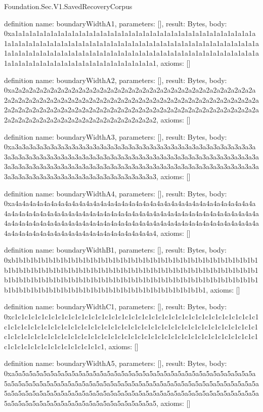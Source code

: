 \begin{lexlean}{Foundation.Sec.V1.SavedRecoveryCorpus}
\begin{semanticmodule}
definition{
  name: boundaryWidthA1,
  parameters: [],
  result: Bytes,
  body: 0xa1a1a1a1a1a1a1a1a1a1a1a1a1a1a1a1a1a1a1a1a1a1a1a1a1a1a1a1a1a1a1a1a1a1a1a1a1a1a1a1a1a1a1a1a1a1a1a1a1a1a1a1a1a1a1a1a1a1a1a1a1a1a1a1a1a1a1a1a1a1a1a1a1a1a1a1a1a1a1a1a1a1a1a1a1a1a1a1a1a1a1a1a1a1a1a1a1a1a1a1a1a1a1a1a1a1a1a1a1a1a1a1a1a1a1a1a1a1a1a1a1a1a1a1a1a1a1a1,
  axioms: []
}

definition{
  name: boundaryWidthA2,
  parameters: [],
  result: Bytes,
  body: 0xa2a2a2a2a2a2a2a2a2a2a2a2a2a2a2a2a2a2a2a2a2a2a2a2a2a2a2a2a2a2a2a2a2a2a2a2a2a2a2a2a2a2a2a2a2a2a2a2a2a2a2a2a2a2a2a2a2a2a2a2a2a2a2a2a2a2a2a2a2a2a2a2a2a2a2a2a2a2a2a2a2a2a2a2a2a2a2a2a2a2a2a2a2a2a2a2a2a2a2a2a2a2a2a2a2a2a2a2a2a2a2a2a2a2a2a2a2a2a2a2a2a2a2a2a2a2a2a2,
  axioms: []
}

definition{
  name: boundaryWidthA3,
  parameters: [],
  result: Bytes,
  body: 0xa3a3a3a3a3a3a3a3a3a3a3a3a3a3a3a3a3a3a3a3a3a3a3a3a3a3a3a3a3a3a3a3a3a3a3a3a3a3a3a3a3a3a3a3a3a3a3a3a3a3a3a3a3a3a3a3a3a3a3a3a3a3a3a3a3a3a3a3a3a3a3a3a3a3a3a3a3a3a3a3a3a3a3a3a3a3a3a3a3a3a3a3a3a3a3a3a3a3a3a3a3a3a3a3a3a3a3a3a3a3a3a3a3a3a3a3a3a3a3a3a3a3a3a3a3a3a3a3,
  axioms: []
}

definition{
  name: boundaryWidthA4,
  parameters: [],
  result: Bytes,
  body: 0xa4a4a4a4a4a4a4a4a4a4a4a4a4a4a4a4a4a4a4a4a4a4a4a4a4a4a4a4a4a4a4a4a4a4a4a4a4a4a4a4a4a4a4a4a4a4a4a4a4a4a4a4a4a4a4a4a4a4a4a4a4a4a4a4a4a4a4a4a4a4a4a4a4a4a4a4a4a4a4a4a4a4a4a4a4a4a4a4a4a4a4a4a4a4a4a4a4a4a4a4a4a4a4a4a4a4a4a4a4a4a4a4a4a4a4a4a4a4a4a4a4a4a4a4a4a4a4a4,
  axioms: []
}

definition{
  name: boundaryWidthB1,
  parameters: [],
  result: Bytes,
  body: 0xb1b1b1b1b1b1b1b1b1b1b1b1b1b1b1b1b1b1b1b1b1b1b1b1b1b1b1b1b1b1b1b1b1b1b1b1b1b1b1b1b1b1b1b1b1b1b1b1b1b1b1b1b1b1b1b1b1b1b1b1b1b1b1b1b1b1b1b1b1b1b1b1b1b1b1b1b1b1b1b1b1b1b1b1b1b1b1b1b1b1b1b1b1b1b1b1b1b1b1b1b1b1b1b1b1b1b1b1b1b1b1b1b1b1b1b1b1b1b1b1b1b1b1b1b1b1b1b1,
  axioms: []
}

definition{
  name: boundaryWidthC1,
  parameters: [],
  result: Bytes,
  body: 0xc1c1c1c1c1c1c1c1c1c1c1c1c1c1c1c1c1c1c1c1c1c1c1c1c1c1c1c1c1c1c1c1c1c1c1c1c1c1c1c1c1c1c1c1c1c1c1c1c1c1c1c1c1c1c1c1c1c1c1c1c1c1c1c1c1c1c1c1c1c1c1c1c1c1c1c1c1c1c1c1c1c1c1c1c1c1c1c1c1c1c1c1c1c1c1c1c1c1c1c1c1c1c1c1c1c1c1c1c1c1c1c1c1c1c1c1c1c1c1c1c1c1c1c1c1c1c1c1,
  axioms: []
}

definition{
  name: boundaryWidthA5,
  parameters: [],
  result: Bytes,
  body: 0xa5a5a5a5a5a5a5a5a5a5a5a5a5a5a5a5a5a5a5a5a5a5a5a5a5a5a5a5a5a5a5a5a5a5a5a5a5a5a5a5a5a5a5a5a5a5a5a5a5a5a5a5a5a5a5a5a5a5a5a5a5a5a5a5a5a5a5a5a5a5a5a5a5a5a5a5a5a5a5a5a5a5a5a5a5a5a5a5a5a5a5a5a5a5a5a5a5a5a5a5a5a5a5a5a5a5a5a5a5a5a5a5a5a5a5a5a5a5a5a5a5a5a5a5a5a5a5a5,
  axioms: []
}


\end{semanticmodule}
\end{lexlean}
